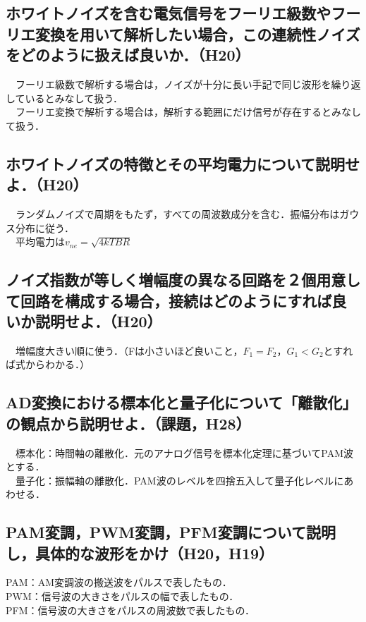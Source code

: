 \subsection{ホワイトノイズを含む電気信号をフーリエ級数やフーリエ変換を用いて解析したい場合，この連続性ノイズをどのように扱えば良いか．（H20）}
　フーリエ級数で解析する場合は，ノイズが十分に長い手記で同じ波形を繰り返しているとみなして扱う．\\
　フーリエ変換で解析する場合は，解析する範囲にだけ信号が存在するとみなして扱う．\\

\subsection{ホワイトノイズの特徴とその平均電力について説明せよ．（H20）}
　ランダムノイズで周期をもたず，すべての周波数成分を含む．振幅分布はガウス分布に従う．\\
　平均電力は$v_{ne} = \sqrt{4kTBR}$\\

\subsection{ノイズ指数が等しく増幅度の異なる回路を２個用意して回路を構成する場合，接続はどのようにすれば良いか説明せよ．（H20）}
　増幅度大きい順に使う．（Fは小さいほど良いこと，$F_1=F_2$，$G_1 < G_2$とすれば式からわかる．）\\

\subsection{AD変換における標本化と量子化について「離散化」の観点から説明せよ．（課題，H28）}
　標本化：時間軸の離散化．元のアナログ信号を標本化定理に基づいてPAM波とする．\\
　量子化：振幅軸の離散化．PAM波のレベルを四捨五入して量子化レベルにあわせる．\\

\subsection{PAM変調，PWM変調，PFM変調について説明し，具体的な波形をかけ（H20，H19）}
\vspace{4cm}
PAM：AM変調波の搬送波をパルスで表したもの．\\
PWM：信号波の大きさをパルスの幅で表したもの．\\
PFM：信号波の大きさをパルスの周波数で表したもの．\\


